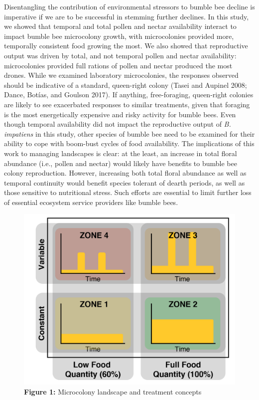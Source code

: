 \documentclass[11pt,]{article}
\begin{document}
Disentangling the contribution of environmental stressors to bumble bee
decline is imperative if we are to be successful in stemming further
declines. In this study, we showed that temporal and total pollen and
nectar availability interact to impact bumble bee microcolony growth,
with microcolonies provided more, temporally consistent food growing the
most. We also showed that reproductive output was driven by total, and
not temporal pollen and nectar availability: microcolonies provided full
rations of pollen and nectar produced the most drones. While we examined
laboratory microcolonies, the responses observed should be indicative of
a standard, queen-right colony (Tasei and Aupinel 2008; Dance, Botías,
and Goulson 2017). If anything, free-foraging, queen-right colonies are
likely to see exacerbated responses to similar treatments, given that
foraging is the most energetically expensive and risky activity for
bumble bees. Even though temporal availability did not impact the
reproductive output of \emph{B. impatiens} in this study, other species
of bumble bee need to be examined for their ability to cope with
boom-bust cycles of food availability. The implications of this work to
managing landscapes is clear: at the least, an increase in total floral
abundance (i.e., pollen and nectar) would likely have benefits to bumble
bee colony reproduction. However, increasing both total floral abundance
as well as temporal continuity would benefit species tolerant of dearth
periods, as well as those sensitive to nutritional stress. Such efforts
are essential to limit further loss of essential ecosystem service
providers like bumble bees.

\begin{figure}
\centering
\includegraphics{./fig1_conceptual.png}
\caption{\textbf{Figure 1:} Microcolony landscape and treatment
concepts}
\end{figure}
\end{document}

